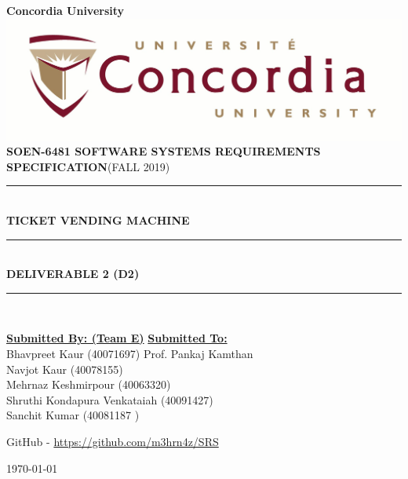 \documentclass[a4paper,12pt]{report}
\newcommand{\TermName}{FALL 2019}
\newcommand{\Course}{\textbf{SOEN-6481 \vspace{0.5cm} SOFTWARE SYSTEMS REQUIREMENTS SPECIFICATION}}
\begin{document}

\begin{titlepage}
\newcommand{\HRule}{\rule{\linewidth}{0.5mm}} %


\centering
\textbf{\LARGE  Concordia University} \\ [5mm] 
\includegraphics[scale=.1]{University_logo.jpg}\\[1cm] 
\textsc{\Large \Course (\TermName)} \\  [0.5cm]

	
\HRule \\[0.4cm]
{ \huge \bfseries TICKET VENDING MACHINE}\\[0.4cm] 
\HRule \\[0.5cm]

{\large \textbf{DELIVERABLE 2 (D2)} }	

\HRule \\[1.5cm]
\vspace{3cm}

\begin{flushleft}


\textbf{\underline{\Large Submitted By: (Team E)}}
\hfill
\textbf{\underline{\Large Submitted To:}} \\
\vspace{3mm}
\large Bhavpreet Kaur (40071697)
\hfill
\large Prof. Pankaj Kamthan \\

\large Navjot Kaur (40078155) \hfill \\
\large Mehrnaz Keshmirpour (40063320) \hfill \\
\large Shruthi Kondapura Venkataiah (40091427) \hfill \\
\large Sanchit Kumar (40081187	) \\

\end{flushleft}

\centering \vspace{1cm}

GitHub - \href{https://github.com/m3hrn4z/SRS}{https://github.com/m3hrn4z/SRS}

\vspace{0.1cm}
{\large \today}\\[2cm]

\vfill
\end{titlepage}
\end{document}
